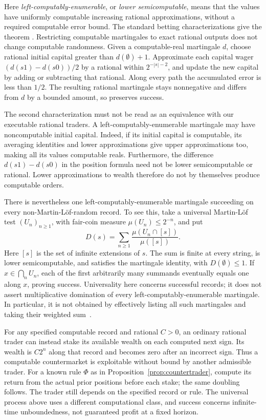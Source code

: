 \documentclass[aps,pra,reprint,superscriptaddress,amsmath,amssymb,floatfix]{revtex4-2}
\theoremstyle{plain}
\theoremstyle{definition}
\theoremstyle{remark}
\begin{document}
Here \emph{left-computably-enumerable}, or \emph{lower semicomputable}, means
that the values have uniformly computable increasing rational approximations,
without a required computable error bound.
The standard betting characterizations give the theorem
\cite{Schnorr1971,DH,Nies2009}.
Restricting computable martingales to exact rational outputs does not change
computable randomness. Given a computable-real martingale \(d\), choose
rational initial capital greater than \(d(\emptyset)+1\). Approximate each
capital wager \((d(s1)-d(s0))/2\) by a rational within
\(2^{-|s|-2}\), and update the new capital by adding or subtracting that
rational. Along every path the accumulated error is less than \(1/2\).
The resulting rational martingale stays nonnegative and differs from \(d\)
by a bounded amount, so preserves success.

The second characterization must not be read as an equivalence with our
executable rational traders. A left-computably-enumerable martingale may
have noncomputable initial capital. Indeed, if its initial capital is
computable, its averaging identities and lower approximations give upper
approximations too, making all its values computable reals. Furthermore,
the difference \(d(s1)-d(s0)\) in the position formula need not be lower
semicomputable or rational. Lower approximations to wealth therefore do not
by themselves produce computable orders.

There is nevertheless one left-computably-enumerable martingale succeeding
on every non-Martin-L\"of-random record. To see this, take a universal
Martin-L\"of test \((U_n)_{n\ge1}\), with fair-coin measure
\(\mu(U_n)\le2^{-n}\), and put
\[
  D(s)=\sum_{n\ge1}\frac{\mu(U_n\cap[s])}{\mu([s])}.
\]
Here \([s]\) is the set of infinite extensions of \(s\).
The sum is finite at every string, is lower semicomputable, and satisfies
the martingale identity, with \(D(\emptyset)\le1\).
If \(x\in\bigcap_nU_n\), each of the first arbitrarily many summands
eventually equals one along \(x\), proving success.
Universality here concerns successful records; it does not assert
multiplicative domination of every left-computably-enumerable martingale.
In particular, it is not obtained by effectively listing all such
martingales and taking their weighted sum~\cite{DH,Nies2009}.

For any specified computable record and rational \(C>0\), an ordinary rational trader can instead
stake its available wealth on each computed next sign. Its wealth is
\(C2^n\) along that record and becomes zero after an incorrect sign.
Thus a computable countermarket is exploitable without bound by another
admissible trader. For a known rule \(\Phi\) as in
Proposition~\ref{prop:countertrader}, compute its return from the actual
prior positions before each stake; the same doubling follows.
The trader still depends on the specified record or rule. The universal process above uses
a different computational class, and success concerns infinite-time
unboundedness, not guaranteed profit at a fixed horizon.
\end{document}
